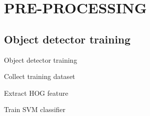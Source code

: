 \documentclass[xcolor=table,compress,blue]{beamer}
\begin{document}
\section{PRE-PROCESSING}
\subsection{Object detector training}
\begin{frame}{Object detector training}
	\begin{exampleblock}{Collect training dataset}

	\end{exampleblock}
	\begin{exampleblock}{Extract HOG feature}

	\end{exampleblock}
	\begin{exampleblock}{Train SVM classifier}

	\end{exampleblock}
\end{frame}
 
\end{document}
